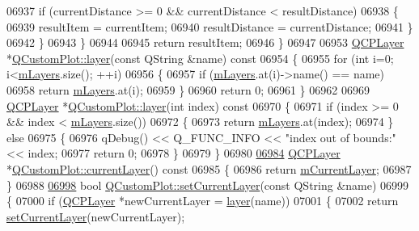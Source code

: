 \begin{DoxyCode}
06937       \textcolor{keywordflow}{if} (currentDistance >= 0 && currentDistance < resultDistance)
06938       \{
06939         resultItem = currentItem;
06940         resultDistance = currentDistance;
06941       \}
06942     \}
06943   \}
06944   
06945   \textcolor{keywordflow}{return} resultItem;
06946 \}
06947 
06953 \hyperlink{a00043}{QCPLayer} *\hyperlink{a00116_ae576ada60c1133318e29348d43d3cf10}{QCustomPlot::layer}(\textcolor{keyword}{const} QString &name)\textcolor{keyword}{ const}
06954 \textcolor{keyword}{}\{
06955   \textcolor{keywordflow}{for} (\textcolor{keywordtype}{int} i=0; i<\hyperlink{a00116_ae46b0ffefe1087007ffb11398a18a20e}{mLayers}.size(); ++i)
06956   \{
06957     \textcolor{keywordflow}{if} (\hyperlink{a00116_ae46b0ffefe1087007ffb11398a18a20e}{mLayers}.at(i)->name() == name)
06958       \textcolor{keywordflow}{return} \hyperlink{a00116_ae46b0ffefe1087007ffb11398a18a20e}{mLayers}.at(i);
06959   \}
06960   \textcolor{keywordflow}{return} 0;
06961 \}
06962 
06969 \hyperlink{a00043}{QCPLayer} *\hyperlink{a00116_ae576ada60c1133318e29348d43d3cf10}{QCustomPlot::layer}(\textcolor{keywordtype}{int} index)\textcolor{keyword}{ const}
06970 \textcolor{keyword}{}\{
06971   \textcolor{keywordflow}{if} (index >= 0 && index < \hyperlink{a00116_ae46b0ffefe1087007ffb11398a18a20e}{mLayers}.size())
06972   \{
06973     \textcolor{keywordflow}{return} \hyperlink{a00116_ae46b0ffefe1087007ffb11398a18a20e}{mLayers}.at(index);
06974   \} \textcolor{keywordflow}{else}
06975   \{
06976     qDebug() << Q\_FUNC\_INFO << \textcolor{stringliteral}{"index out of bounds:"} << index;
06977     \textcolor{keywordflow}{return} 0;
06978   \}
06979 \}
06980 
\hypertarget{a00115_source_l06984}{}\hyperlink{a00116_af73057345656cbd1463454982d808b00}{06984} \hyperlink{a00043}{QCPLayer} *\hyperlink{a00116_af73057345656cbd1463454982d808b00}{QCustomPlot::currentLayer}()\textcolor{keyword}{ const}
06985 \textcolor{keyword}{}\{
06986   \textcolor{keywordflow}{return} \hyperlink{a00116_ae9821179b860bf04af25882e881e5e09}{mCurrentLayer}; 
06987 \}
06988 
\hypertarget{a00115_source_l06998}{}\hyperlink{a00116_a73a6dc47c653bb6f8f030abca5a11852}{06998} \textcolor{keywordtype}{bool} \hyperlink{a00116_a73a6dc47c653bb6f8f030abca5a11852}{QCustomPlot::setCurrentLayer}(\textcolor{keyword}{const} QString &name)
06999 \{
07000   \textcolor{keywordflow}{if} (\hyperlink{a00043}{QCPLayer} *newCurrentLayer = \hyperlink{a00116_ae576ada60c1133318e29348d43d3cf10}{layer}(name))
07001   \{
07002     \textcolor{keywordflow}{return} \hyperlink{a00116_a73a6dc47c653bb6f8f030abca5a11852}{setCurrentLayer}(newCurrentLayer);

\end{DoxyCode}
